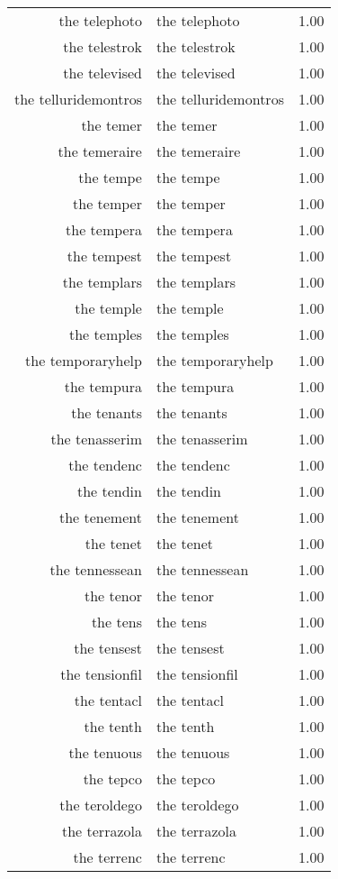 \begin{table}[ht]
\begin{tabular}{rlr}
  the telephoto & the telephoto & 1.00 \\ 
  the telestrok & the telestrok & 1.00 \\ 
  the televised & the televised & 1.00 \\ 
  the telluridemontros & the telluridemontros & 1.00 \\ 
  the temer & the temer & 1.00 \\ 
  the temeraire & the temeraire & 1.00 \\ 
  the tempe & the tempe & 1.00 \\ 
  the temper & the temper & 1.00 \\ 
  the tempera & the tempera & 1.00 \\ 
  the tempest & the tempest & 1.00 \\ 
  the templars & the templars & 1.00 \\ 
  the temple & the temple & 1.00 \\ 
  the temples & the temples & 1.00 \\ 
  the temporaryhelp & the temporaryhelp & 1.00 \\ 
  the tempura & the tempura & 1.00 \\ 
  the tenants & the tenants & 1.00 \\ 
  the tenasserim & the tenasserim & 1.00 \\ 
  the tendenc & the tendenc & 1.00 \\ 
  the tendin & the tendin & 1.00 \\ 
  the tenement & the tenement & 1.00 \\ 
  the tenet & the tenet & 1.00 \\ 
  the tennessean & the tennessean & 1.00 \\ 
  the tenor & the tenor & 1.00 \\ 
  the tens & the tens & 1.00 \\ 
  the tensest & the tensest & 1.00 \\ 
  the tensionfil & the tensionfil & 1.00 \\ 
  the tentacl & the tentacl & 1.00 \\ 
  the tenth & the tenth & 1.00 \\ 
  the tenuous & the tenuous & 1.00 \\ 
  the tepco & the tepco & 1.00 \\ 
  the teroldego & the teroldego & 1.00 \\ 
  the terrazola & the terrazola & 1.00 \\ 
  the terrenc & the terrenc & 1.00 \\ 

\end{tabular}
\end{table}
